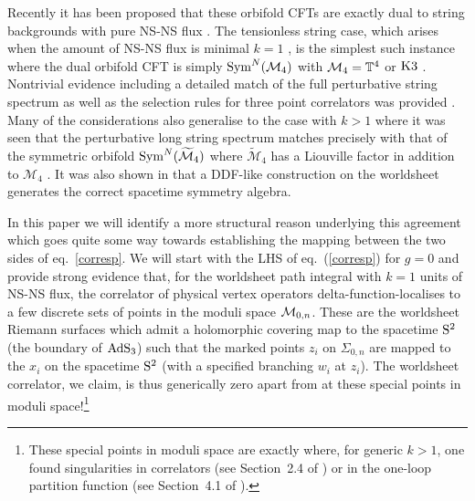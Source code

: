 \documentclass[12pt,a4paper]{article}
\begin{document}
Recently it has been proposed \cite{Gaberdiel:2018rqv,Eberhardt:2018ouy} that these orbifold CFTs are exactly dual to string backgrounds with pure NS-NS flux \cite{Maldacena:2000hw, Maldacena:2000kv, Maldacena:2001km}. The tensionless string case, which arises when the amount of NS-NS flux is minimal $k=1$ \cite{Gaberdiel:2017oqg,Ferreira:2017pgt}, is the simplest such instance where the dual orbifold CFT is simply ${\rm Sym}^N({\cal M}_4)$ with ${\cal M}_4=\mathbb{T}^4$ or ${\rm K3}$ \cite{Gaberdiel:2018rqv,Eberhardt:2018ouy}. Nontrivial evidence including a detailed match of the full perturbative string spectrum as well as the selection rules for three point correlators was provided \cite{Gaberdiel:2018rqv,Eberhardt:2018ouy}. Many of the considerations also generalise to the case with $k>1$ where it was seen that the perturbative long string spectrum matches precisely with that of the symmetric orbifold ${\rm Sym}^N(\widetilde{\mathcal{M}}_4)$ where $\widetilde{\mathcal{M}}_4$ has a Liouville factor in addition to  $\mathcal{M}_4$ \cite{Eberhardt:2019qcl}. It was also shown in 
 \cite{Eberhardt:2019qcl} that a DDF-like \cite{DelGiudice:1971yjh} construction on the worldsheet generates the correct spacetime symmetry algebra.  

In this paper we will identify a more structural reason underlying this agreement which goes quite some way towards establishing the mapping between the two sides of eq.~\eqref{corresp}. 
We will start with the LHS of eq.~(\ref{corresp}) for $g=0$ and provide strong evidence that, for the worldsheet path integral with $k=1$ units of NS-NS flux, the correlator of physical vertex operators delta-function-localises to a few discrete sets of points in the moduli space ${\cal M}_{0,n}$. These are the worldsheet Riemann surfaces which admit a holomorphic covering map to the spacetime ${\rm S}^2$ (the boundary of ${\rm AdS}_3$) such that the marked points $z_i$ on $\Sigma_{0,n}$ are  mapped to the $x_i$ on the spacetime ${\rm S}^2$ (with a specified branching $w_i$ at $z_i$). The worldsheet correlator, we claim, is thus generically zero apart from at these special points in moduli space!\footnote{These special points in moduli space are exactly where, for generic $k>1$, one found 
singularities in correlators (see Section~2.4 of \cite{Maldacena:2001km}) or in the one-loop partition function (see Section~4.1 of \cite{Maldacena:2000kv}).}
\end{document}
